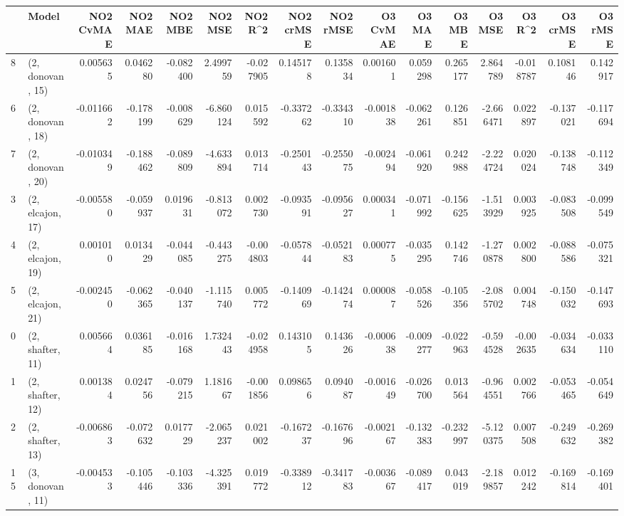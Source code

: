 \begin{tabular}{llrrrrrrrrrrrrrr}
\toprule
{} &             Model &  NO2 CvMAE &   NO2 MAE &   NO2 MBE &    NO2 MSE &   NO2 R\textasciicircum2 &  NO2 crMSE &  NO2 rMSE &  O3 CvMAE &    O3 MAE &    O3 MBE &     O3 MSE &    O3 R\textasciicircum2 &  O3 crMSE &   O3 rMSE \\
\midrule
8  &  (2, donovan, 15) &   0.005635 &  0.046280 & -0.082400 &   2.499759 & -0.027905 &   0.145178 &  0.135834 &  0.001601 &  0.059298 &  0.265177 &   2.864789 & -0.018787 &  0.108146 &  0.142917 \\
6  &  (2, donovan, 18) &  -0.011662 & -0.178199 & -0.008629 &  -6.860124 &  0.015592 &  -0.337262 & -0.334310 & -0.001838 & -0.062261 &  0.126851 &  -2.666471 &  0.022897 & -0.137021 & -0.117694 \\
7  &  (2, donovan, 20) &  -0.010349 & -0.188462 & -0.089809 &  -4.633894 &  0.013714 &  -0.250143 & -0.255075 & -0.002494 & -0.061920 &  0.242988 &  -2.224724 &  0.020024 & -0.138748 & -0.112349 \\
3  &  (2, elcajon, 17) &  -0.005580 & -0.059937 &  0.019631 &  -0.813072 &  0.002730 &  -0.093591 & -0.095627 &  0.000341 & -0.071992 & -0.156625 &  -1.513929 &  0.003925 & -0.083508 & -0.099549 \\
4  &  (2, elcajon, 19) &   0.001010 &  0.013429 & -0.044085 &  -0.443275 & -0.004803 &  -0.057844 & -0.052183 &  0.000775 & -0.035295 &  0.142746 &  -1.270878 &  0.002800 & -0.088586 & -0.075321 \\
5  &  (2, elcajon, 21) &  -0.002450 & -0.062365 & -0.040137 &  -1.115740 &  0.005772 &  -0.140969 & -0.142474 &  0.000087 & -0.058526 & -0.105356 &  -2.085702 &  0.004748 & -0.150032 & -0.147693 \\
0  &  (2, shafter, 11) &   0.005664 &  0.036185 & -0.016168 &   1.732443 & -0.024958 &   0.143105 &  0.143626 & -0.000638 & -0.009277 & -0.022963 &  -0.594528 & -0.002635 & -0.034634 & -0.033110 \\
1  &  (2, shafter, 12) &   0.001384 &  0.024756 & -0.079215 &   1.181667 & -0.001856 &   0.098656 &  0.094087 & -0.001649 & -0.026700 &  0.013564 &  -0.964551 &  0.002766 & -0.053465 & -0.054649 \\
2  &  (2, shafter, 13) &  -0.006863 & -0.072632 &  0.017729 &  -2.065237 &  0.021002 &  -0.167237 & -0.167696 & -0.002167 & -0.132383 & -0.232997 &  -5.120375 &  0.007508 & -0.249632 & -0.269382 \\
15 &  (3, donovan, 11) &  -0.004533 & -0.105446 & -0.103336 &  -4.325391 &  0.019772 &  -0.338912 & -0.341783 & -0.003667 & -0.089417 &  0.043019 &  -2.189857 &  0.012242 & -0.169814 & -0.169401 \\

\end{tabular}
